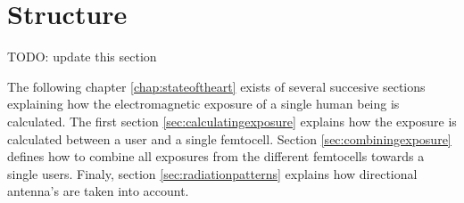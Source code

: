 
\section{Structure}
\label{sec:structure}

TODO: update this section

The following chapter \ref{chap:stateoftheart} exists of several succesive sections explaining how the electromagnetic exposure of a single human being is calculated. The first section \ref{sec:calculatingexposure}
explains how the exposure is calculated between a user and a single femtocell. Section \ref{sec:combiningexposure}  defines how to combine all exposures from the different femtocells towards a single users.
Finaly, section \ref{sec:radiationpatterns} explains how directional antenna's are taken into account.


